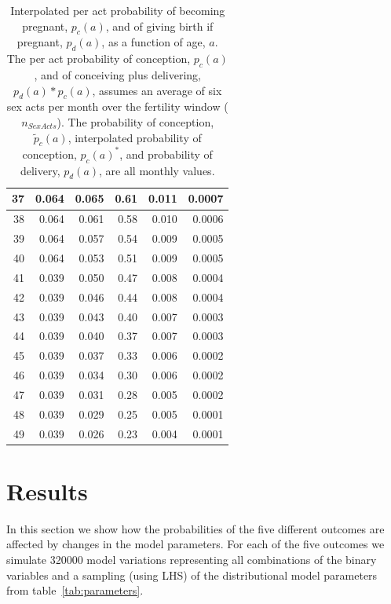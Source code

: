 \documentclass[11pt]{nih_mod}
\begin{document}
\begin{table} [H]
\begin{center}
{\begin{tabular}{|r|r|r|r|r|r|}
\hline
        37 &       0.064 & 0.065 & 0.61 & 0.011 & 0.0007\\
\hline
        38 &       0.064 & 0.061 & 0.58 & 0.010 & 0.0006\\
\hline
        39 &      0.064 &  0.057 & 0.54 & 0.009 & 0.0005\\
\hline
        40 &      0.064 & 0.053 & 0.51 & 0.009 & 0.0005\\
\hline
        41 &       0.039 & 0.050 & 0.47 & 0.008 & 0.0004\\
\hline
        42 &       0.039 & 0.046 & 0.44 & 0.008 & 0.0004\\
\hline
        43 &       0.039 & 0.043 & 0.40 & 0.007 & 0.0003\\
\hline
        44 &       0.039 & 0.040 & 0.37 & 0.007 &0.0003\\
\hline
        45 &       0.039 & 0.037 & 0.33 & 0.006 &0.0002\\
\hline
        46 &       0.039 & 0.034 & 0.30 & 0.006 & 0.0002\\
\hline
        47 &       0.039 & 0.031 & 0.28 & 0.005 & 0.0002\\
\hline
        48 &       0.039 & 0.029 & 0.25 & 0.005 & 0.0001\\
\hline
        49 &       0.039 & 0.026 & 0.23 & 0.004 & 0.0001\\
\hline
\end{tabular} }
	\caption{Interpolated per act probability of becoming pregnant, $p_c(a)$, and of giving birth if pregnant, $p_d(a)$, as a function of age, $a$.  The per act probability of conception, $p_c(a)$, and of conceiving plus delivering, $p_d(a) * p_c(a)$,  assumes an average of six sex acts per month over the fertility window ($n_{SexActs}$).  The probability of conception, $\tilde{p}_ c(a)$, interpolated probability of conception,  $p_c(a)^*$, and probability of delivery, $p_d(a)$, are all monthly values.        \label{tab:pregnancy}}
\end{center}
\end{table} 

\section{Results}
\label{sec:results}
In this section we show how the probabilities of the five different outcomes are affected by changes in the model parameters.  For each of the five outcomes we simulate 320000 model variations representing all combinations of the binary variables and a sampling (using LHS) of the distributional model parameters from table~\ref{tab:parameters}. 
\end{document}
